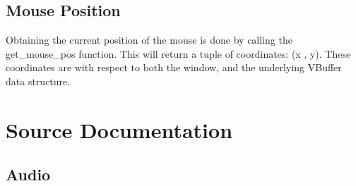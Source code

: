 \documentclass[letterpaper,10pt,english,openany,oneside]{sphinxmanual}
\begin{document}
\section{Mouse Position}
\label{\detokenize{fundamentals:mouse-position}}
\sphinxAtStartPar
Obtaining the current position of the mouse is done by calling the get\_mouse\_pos function. This will return a tuple of coordinates: (x , y). These coordinates are with respect to both the window, and the underlying VBuffer data structure.
\def\sphinxLiteralBlockLabel{\label{\detokenize{fundamentals:id17}}}
\begin{sphinxVerbatim}[commandchars=\\\{\}]
    
       
        
     \PYG{p}{[}\PYG{p}{[}\PYG{p}{]} \PYG{p}{[}\PYG{p}{]}\PYG{p}{]}   
\end{sphinxVerbatim}


\chapter{Source Documentation}
\label{\detokenize{dpav:source-documentation}}\label{\detokenize{dpav::doc}}

\section{Audio}
\label{\detokenize{dpav:audio}}
\end{document}
